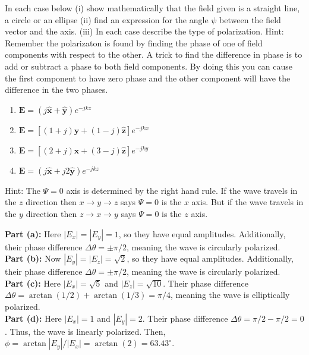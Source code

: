 \documentclass[11pt]{article}
\newcommand{\bh}[1]{\mathbf{\hat{#1}}}
\begin{document}
\pagebreak

\begin{homeworkProblem}

    In each case below (i) show mathematically that the field given is a straight line, a circle or an
    ellipse (ii) find an expression for the angle $\psi$ between the field vector and the axis. (iii) In each
    case describe the type of polarization. Hint: Remember the polarizaton is found by finding the
    phase of one of field components with respect to the other. A trick to find the difference in phase
    is to add or subtract a phase to both field components. By doing this you can cause the first
    component to have zero phase and the other component will have the difference in the two phases.

    \begin{enumerate}[label=(\alph*), topsep=5pt]
        \item $\mathbf{E} = (j\bh{x} + \bh{y}) e^{-jkz}$
        \item $\mathbf{E} = [(1 + j)\bh{y} + (1-j) \bh{z}] e^{-jkx}$
        \item $\mathbf{E} = [(2 + j)\bh{x} + (3-j) \bh{z}] e^{-jky}$
        \item $\mathbf{E} = (j \bh{x} + j2\bh{y}) e^{-jkz}$
    \end{enumerate}

    Hint: The $\Psi = 0$ axis is determined by the right hand rule. If the wave travels in the $z$ direction then
    $x \rightarrow y \rightarrow z$ says $\Psi = 0$ is the $x$ axis. But if the wave travels in the $y$ direction then
    $z \rightarrow x \rightarrow y$ says $\Psi = 0$ is the $z$ axis.
    \vspace{1\baselineskip}

    \solution

    \textbf{Part (a):} Here $|E_x| = |E_y| = 1$, so they have equal amplitudes. Additionally, their phase difference $\Delta \theta = \pm \pi/2$, meaning the wave is circularly polarized. \\

    \textbf{Part (b):} Now $|E_y| = |E_z| = \sqrt{2}$, so they have equal amplitudes. Additionally, their phase difference $\Delta \theta = \pm \pi/2$, meaning the wave is circularly polarized. \\

    \textbf{Part (c):} Here $|E_x| = \sqrt{5}$ and $|E_z| = \sqrt{10}$. Their phase difference $\Delta \theta = \arctan(1/2) + \arctan(1/3) = \pi/4$, meaning the wave is elliptically polarized. \\

    \textbf{Part (d):} Here $|E_x| = 1$ and $|E_y| = 2$. Their phase difference $\Delta \theta = \pi/2 - \pi/2 = 0$. Thus, the wave is linearly polarized. Then, $\phi = \arctan|E_y|/|E_x| = \arctan(2) = 63.43^\circ$.




\end{homeworkProblem}
\end{document}
